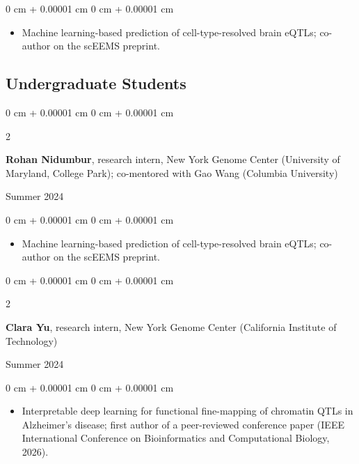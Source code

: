 \documentclass[10pt, letterpaper]{article}
\newenvironment{highlights}{
    \begin{itemize}[
        topsep=0.10 cm,
        parsep=0.10 cm,
        partopsep=0pt,
        itemsep=0pt,
        leftmargin=0 cm + 10pt
    ]
}{
    \end{itemize}
} %
\newenvironment{onecolentry}{
    \begin{adjustwidth}{
        0 cm + 0.00001 cm
    }{
        0 cm + 0.00001 cm
    }
}{
    \end{adjustwidth}
} %
\newenvironment{twocolentry}[2][]{
    \onecolentry
    \def\secondColumn{#2}
    \setcolumnwidth{\fill, 4.5 cm}
    \begin{paracol}{2}
}{
    \switchcolumn \raggedleft \secondColumn
    \end{paracol}
    \endonecolentry
} %
\begin{document}
    \vspace{0.10 cm}
    \begin{onecolentry}
        \begin{highlights}
            \item Machine learning-based prediction of cell-type-resolved brain eQTLs; co-author on the scEEMS preprint.
        \end{highlights}
    \end{onecolentry}

    \vspace{0.20 cm}

\subsection{Undergraduate Students}

    \begin{twocolentry}{
        Summer 2024
    }
        \textbf{Rohan Nidumbur}, research intern, New York Genome Center (University of Maryland, College Park); co-mentored with Gao Wang (Columbia University)
    \end{twocolentry}

    \vspace{0.10 cm}
    \begin{onecolentry}
        \begin{highlights}
            \item Machine learning-based prediction of cell-type-resolved brain eQTLs; co-author on the scEEMS preprint.
        \end{highlights}
    \end{onecolentry}

    \vspace{0.20 cm}

    \begin{twocolentry}{
        Summer 2024
    }
        \textbf{Clara Yu}, research intern, New York Genome Center (California Institute of Technology)
    \end{twocolentry}

    \vspace{0.10 cm}
    \begin{onecolentry}
        \begin{highlights}
            \item Interpretable deep learning for functional fine-mapping of chromatin QTLs in Alzheimer's disease; first author of a peer-reviewed conference paper (IEEE International Conference on Bioinformatics and Computational Biology, 2026).
        \end{highlights}
    \end{onecolentry}
\end{document}
